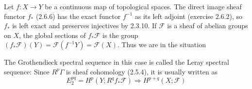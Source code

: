 \begin{example} Let $f: X \rightarrow Y$ be a continuous map of topological spaces. The direct image sheaf functor $f_*$ (2.6.6) has the exact functor $f^{-1}$ as its left adjoint (exercise 2.6.2), so $f_*$ is left exact and preserves injectives by 2.3.10. If $\mathcal{F}$ is a sheaf of abelian groups on $X$, the global sections of $f_* \mathcal{F}$ is the group $\left(f_* \mathcal{F}\right)(Y)=\mathcal{F}\left(f^{-1} Y\right)=\mathcal{F}(X)$. Thus we are in the situation 
    
The Grothendieck spectral sequence in this case is called the Leray spectral sequence: Since $R^p \Gamma$ is sheaf cohomology (2.5.4), it is usually written as
$$
E_2^{p q}=H^p\left(Y ; R^q f_* \mathcal{F}\right) \Rightarrow H^{p+q}(X ; \mathcal{F})
$$
\end{example}


